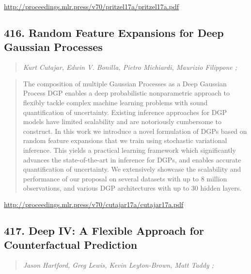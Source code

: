 \documentclass{article}
\begin{document}
\href{http://proceedings.mlr.press/v70/pritzel17a/pritzel17a.pdf}{http://proceedings.mlr.press/v70/pritzel17a/pritzel17a.pdf}

\subsection{416. Random Feature Expansions for Deep Gaussian Processes}

\begin{quote}
\footnotesize{\textit{Kurt Cutajar, Edwin V. Bonilla, Pietro Michiardi, Maurizio Filippone ;}}

\end{quote}

\begin{quote}
    The composition of multiple Gaussian Processes as a Deep Gaussian Process DGP enables a deep probabilistic nonparametric approach to flexibly tackle complex machine learning problems with sound quantification of uncertainty. Existing inference approaches for DGP models have limited scalability and are notoriously cumbersome to construct. In this work we introduce a novel formulation of DGPs based on random feature expansions that we train using stochastic variational inference. This yields a practical learning framework which significantly advances the state-of-the-art in inference for DGPs, and enables accurate quantification of uncertainty. We extensively showcase the scalability and performance of our proposal on several datasets with up to 8 million observations, and various DGP architectures with up to 30 hidden layers.  
\end{quote}

\href{http://proceedings.mlr.press/v70/cutajar17a/cutajar17a.pdf}{http://proceedings.mlr.press/v70/cutajar17a/cutajar17a.pdf}

\subsection{417. Deep IV: A Flexible Approach for Counterfactual Prediction}

\begin{quote}
\footnotesize{\textit{Jason Hartford, Greg Lewis, Kevin Leyton-Brown, Matt Taddy ;}}

\end{quote}
\end{document}
